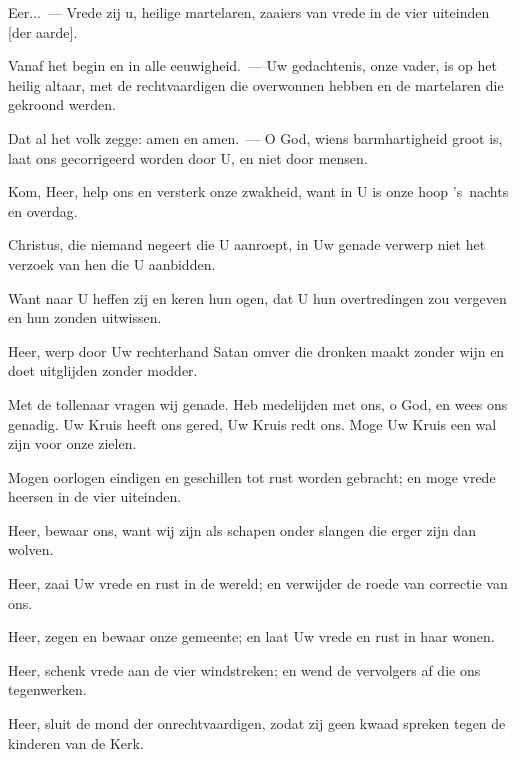 \documentclass[12pt,twoside,a5paper]{article}
\begin{document}
\begin{halfparskip}
  Eer...~--- Vrede zij u, heilige martelaren, zaaiers van vrede in de vier uiteinden [der aarde].

  Vanaf het begin en in alle eeuwigheid.~--- Uw gedachtenis, onze vader, is op het heilig altaar, met de rechtvaardigen die overwonnen hebben en de martelaren die gekroond werden.

  Dat al het volk zegge: amen en amen.~--- O God, wiens barmhartigheid groot is, laat ons gecorrigeerd worden door U, en niet door mensen.

  Kom, Heer, help ons en versterk onze zwakheid, want in U is onze hoop 's~nachts en overdag.

  Christus, die niemand negeert die U aanroept, in Uw genade verwerp niet het verzoek van hen die U aanbidden.

  Want naar U heffen zij en keren hun ogen, dat U hun overtredingen zou vergeven en hun zonden uitwissen.

  Heer, werp door Uw rechterhand Satan omver die dronken maakt zonder wijn en doet uitglijden zonder modder.

  Met de tollenaar vragen wij genade. Heb medelijden met ons, o God, en wees ons genadig. Uw Kruis heeft ons gered, Uw Kruis redt ons. Moge Uw Kruis een wal zijn voor onze zielen.

  Mogen oorlogen eindigen en geschillen tot rust worden gebracht; en moge vrede heersen in de vier uiteinden.

  Heer, bewaar ons, want wij zijn als schapen onder slangen die erger zijn dan wolven.

  Heer, zaai Uw vrede en rust in de wereld; en verwijder de roede van correctie van ons.

  Heer, zegen en bewaar onze gemeente; en laat Uw vrede en rust in haar wonen.

  Heer, schenk vrede aan de vier windstreken; en wend de vervolgers af die ons tegenwerken.

  Heer, sluit de mond der onrechtvaardigen, zodat zij geen kwaad spreken tegen de kinderen van de Kerk.
\end{halfparskip}
\end{document}
